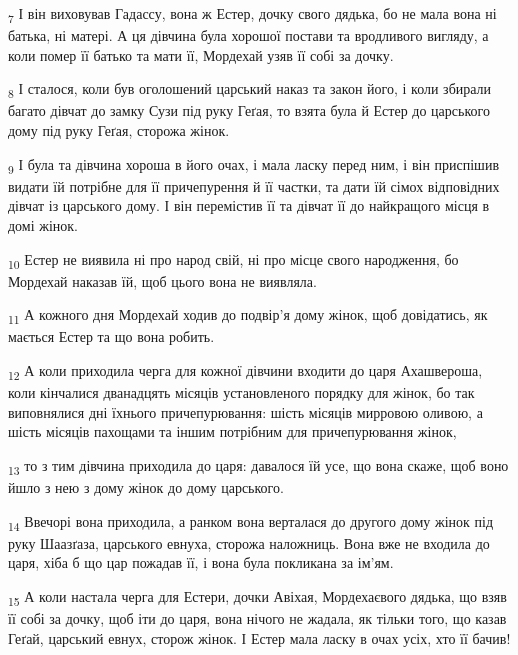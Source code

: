 \begin{tcolorbox}
\textsubscript{7} І він виховував Гадассу, вона ж Естер, дочку свого дядька, бо не мала вона ні батька, ні матері. А ця дівчина була хорошої постави та вродливого вигляду, а коли помер її батько та мати її, Мордехай узяв її собі за дочку.
\end{tcolorbox}
\begin{tcolorbox}
\textsubscript{8} І сталося, коли був оголошений царський наказ та закон його, і коли збирали багато дівчат до замку Сузи під руку Геґая, то взята була й Естер до царського дому під руку Геґая, сторожа жінок.
\end{tcolorbox}
\begin{tcolorbox}
\textsubscript{9} І була та дівчина хороша в його очах, і мала ласку перед ним, і він приспішив видати їй потрібне для її причепурення й її частки, та дати їй сімох відповідних дівчат із царського дому. І він перемістив її та дівчат її до найкращого місця в домі жінок.
\end{tcolorbox}
\begin{tcolorbox}
\textsubscript{10} Естер не виявила ні про народ свій, ні про місце свого народження, бо Мордехай наказав їй, щоб цього вона не виявляла.
\end{tcolorbox}
\begin{tcolorbox}
\textsubscript{11} А кожного дня Мордехай ходив до подвір'я дому жінок, щоб довідатись, як мається Естер та що вона робить.
\end{tcolorbox}
\begin{tcolorbox}
\textsubscript{12} А коли приходила черга для кожної дівчини входити до царя Ахашвероша, коли кінчалися дванадцять місяців установленого порядку для жінок, бо так виповнялися дні їхнього причепурювання: шість місяців мирровою оливою, а шість місяців пахощами та іншим потрібним для причепурювання жінок,
\end{tcolorbox}
\begin{tcolorbox}
\textsubscript{13} то з тим дівчина приходила до царя: давалося їй усе, що вона скаже, щоб воно йшло з нею з дому жінок до дому царського.
\end{tcolorbox}
\begin{tcolorbox}
\textsubscript{14} Ввечорі вона приходила, а ранком вона верталася до другого дому жінок під руку Шаазґаза, царського евнуха, сторожа наложниць. Вона вже не входила до царя, хіба б що цар пожадав її, і вона була покликана за ім'ям.
\end{tcolorbox}
\begin{tcolorbox}
\textsubscript{15} А коли настала черга для Естери, дочки Авіхая, Мордехаєвого дядька, що взяв її собі за дочку, щоб іти до царя, вона нічого не жадала, як тільки того, що казав Геґай, царський евнух, сторож жінок. І Естер мала ласку в очах усіх, хто її бачив!
\end{tcolorbox}

